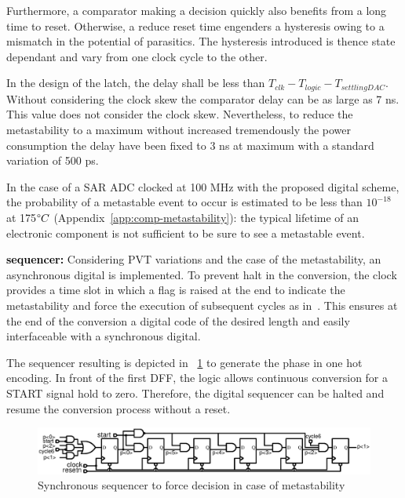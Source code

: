 Furthermore, a comparator making a decision quickly also benefits from a long time to reset. Otherwise, a reduce reset time engenders a hysteresis owing to a mismatch in the potential of parasitics. The hysteresis introduced is thence state dependant and vary from one clock cycle to the other. 

In the design of the latch, the delay shall be less than \(T_{clk} -  T_{logic} - T_{settlingDAC}\). Without considering the clock skew the comparator delay can be as large as 7 ns. This value does not consider the clock skew. Nevertheless, to reduce the metastability to a maximum without increased tremendously the power consumption the delay have been fixed to 3 ns at maximum with a standard variation of 500 ps.

In the case of a SAR ADC clocked at 100 MHz with the proposed digital scheme, the probability of a metastable event to occur is estimated to be less than $10^{-18}$ at 175$\degree C$ (Appendix~\ref{app:comp-metastability}): the typical lifetime of an electronic component is not sufficient to be sure to see a metastable event.

\textbf{\textcolor{black}{sequencer:}}
Considering PVT variations and the case of the metastability, an asynchronous digital is implemented. To prevent halt in the conversion, the clock provides a time slot in which a flag is raised at the end to indicate the metastability and force the execution of subsequent cycles as in~\cite{Tung2016}. This ensures at the end of the conversion a digital code of the desired length and easily interfaceable with a synchronous digital.

The sequencer resulting is depicted in \figurename~\ref{fig:sar-async-sequencer} to generate the phase in one hot encoding. In front of the first DFF, the logic allows continuous conversion for a START signal hold to zero. Therefore, the digital sequencer can be halted and resume the conversion process without a reset.

\begin{figure}[htp]
	\centering
	\includegraphics[width=\textwidth]{Chapter4/Figs/sar-sequencer.ps}
	\caption{Synchronous sequencer to force decision in case of metastability}
	\label{fig:sar-async-sequencer}
\end{figure}

